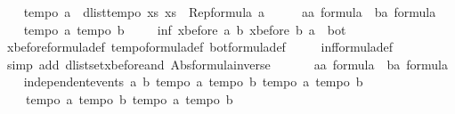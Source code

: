 \begin{isabellebody}
\isanewline
{}\isamarkupfalse%
\ \isanewline
\ \ {\isachardoublequoteopen}tempo{}\ a\ {\isacharequal}\ dlist{\isacharunderscore}tempo{}\ {\isacharparenleft}{\isasymlambda}xs{\isachardot}\ xs\ {\isasymin}\ Rep{\isacharunderscore}formula\ a{\isacharparenright}{\isachardoublequoteclose}\isanewline
\isanewline
{}\isamarkupfalse%
%
\isadelimproof
\ %
\endisadelimproof
%
\isatagproof
{}\isamarkupfalse%
\isanewline
\ \ \isamarkupfalse%
\ a{\isacharcolon}{\isacharcolon}{\isachardoublequoteopen}{\isacharprime}a\ formula{\isachardoublequoteclose}\ \ b{\isacharcolon}{\isacharcolon}{\isachardoublequoteopen}{\isacharprime}a\ formula{\isachardoublequoteclose}\isanewline
\ \ \isamarkupfalse%
\ {\isachardoublequoteopen}tempo{}\ a{\isachardoublequoteclose}\ {\isachardoublequoteopen}tempo{}\ b{\isachardoublequoteclose}\ \isanewline
\ \ \isamarkupfalse%
\ {\isachardoublequoteopen}inf\ {\isacharparenleft}xbefore\ a\ b{\isacharparenright}\ {\isacharparenleft}xbefore\ b\ a{\isacharparenright}\ {\isacharequal}\ bot{\isachardoublequoteclose}\isanewline
\ \ \isamarkupfalse%
\ xbefore{\isacharunderscore}formula{\isacharunderscore}def\ tempo{}{\isacharunderscore}formula{\isacharunderscore}def\ bot{\isacharunderscore}formula{\isacharunderscore}def\ \isanewline
\ \ \ \ inf{\isacharunderscore}formula{\isacharunderscore}def\isanewline
\ \ \isamarkupfalse%
\ {\isacharparenleft}simp\ add{\isacharcolon}\ dlistset{\isacharunderscore}xbefore{\isacharunderscore}and\ Abs{\isacharunderscore}formula{\isacharunderscore}inverse{\isacharparenright}\isanewline
\ \ \isamarkupfalse%
\isanewline
\ \ \isamarkupfalse%
\ a{\isacharcolon}{\isacharcolon}{\isachardoublequoteopen}{\isacharprime}a\ formula{\isachardoublequoteclose}\ \ b{\isacharcolon}{\isacharcolon}{\isachardoublequoteopen}{\isacharprime}a\ formula{\isachardoublequoteclose}\isanewline
\ \ \isamarkupfalse%
\ {\isachardoublequoteopen}independent{\isacharunderscore}events\ a\ b{\isachardoublequoteclose}\ {\isachardoublequoteopen}tempo{}\ a{\isachardoublequoteclose}\ {\isachardoublequoteopen}tempo{}\ b{\isachardoublequoteclose}\ {\isachardoublequoteopen}tempo{}\ a{\isachardoublequoteclose}\ {\isachardoublequoteopen}tempo{}\ b{\isachardoublequoteclose}\isanewline
\ \ \ \ {\isachardoublequoteopen}tempo{}\ a{\isachardoublequoteclose}\ {\isachardoublequoteopen}tempo{}\ b{\isachardoublequoteclose}\ {\isachardoublequoteopen}tempo{}\ a{\isachardoublequoteclose}\ {\isachardoublequoteopen}tempo{}\ b{\isachardoublequoteclose}\isanewline

\end{isabellebody}
